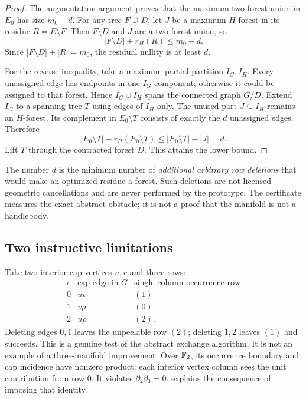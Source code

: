 \begin{proof}
The augmentation argument proves that the maximum two-forest union in
$E_0$ has size $m_0-d$. For any tree $F\supseteq D$, let $J$ be a maximum
$H$-forest in its residue $R=E\setminus F$. Then $F\setminus D$ and $J$
are a two-forest union, so
\[
 |F\setminus D|+r_H(R)\leq m_0-d.
\]
Since $|F\setminus D|+|R|=m_0$, the residual nullity is at least $d$.

For the reverse inequality, take a maximum partial partition $I_G,I_H$.
Every unassigned edge has endpoints in one $I_G$ component; otherwise it
could be assigned to that forest. Hence $I_G\cup I_H$ spans the connected
graph $G/D$. Extend $I_G$ to a spanning tree $T$ using edges of $I_H$ only.
The unused part $J\subseteq I_H$ remains an $H$-forest. Its complement in
$E_0\setminus T$ consists of exactly the $d$ unassigned edges. Therefore
\[
 |E_0\setminus T|-r_H(E_0\setminus T)
 \leq |E_0\setminus T|-|J|=d.
\]
Lift $T$ through the contracted forest $D$. This attains the lower bound.
\end{proof}

The number $d$ is the minimum number of \emph{additional arbitrary row
deletions} that would make an optimized residue a forest. Such deletions are
not licensed geometric cancellations and are never performed by the
prototype. The certificate measures the exact abstract obstacle; it is not
a proof that the manifold is not a handlebody.

\subsection{Two instructive limitations}

\begin{example}
\label{ex:abstract}
Take two interior cap vertices $u,v$ and three rows:
\[
\begin{array}{c|c|c}
e&\text{cap edge in }G&\text{single-column occurrence row}\\\hline
0&uv&(1)\\
1&v\rho&(0)\\
2&u\rho&(2).
\end{array}
\]
Deleting edges $0,1$ leaves the unpeelable row $(2)$; deleting $1,2$
leaves $(1)$ and succeeds. This is a genuine test of the abstract exchange
algorithm. It is not an example of a three-manifold improvement. Over
$\mathbb F_2$, its occurrence boundary and cap incidence have nonzero product:
each interior vertex column sees the unit contribution from row $0$.
It violates $\partial_2\partial_3=0$.  explains the
consequence of imposing that identity.
\end{example}

